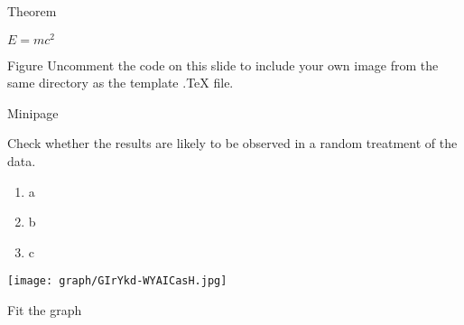 \documentclass[aspectratio=169,xcolor=dvipsnames]{beamer}
\begin{document}
\begin{frame}{Theorem}
    \begin{theorem}
        $E = mc^2$
    \end{theorem}
\end{frame}


\begin{frame}{Figure}
\label{figure}
    Uncomment the code on this slide to include your own image from the same directory as the template .TeX file.
\end{frame}


\begin{frame}{Minipage}
\begin{minipage}[l]{.6\textwidth}%
Check whether the results are likely to be observed in a random treatment of the data.
\begin{enumerate}
    \item a
    \item b
    \item c
\end{enumerate}
\end{minipage}%
\begin{minipage}{.4\textwidth}%
    \texttt{[image: graph/GIrYkd-WYAICasH.jpg]}
\end{minipage}
\end{frame}


\begin{frame}{Fit the graph}
\end{frame}


\end{document}
